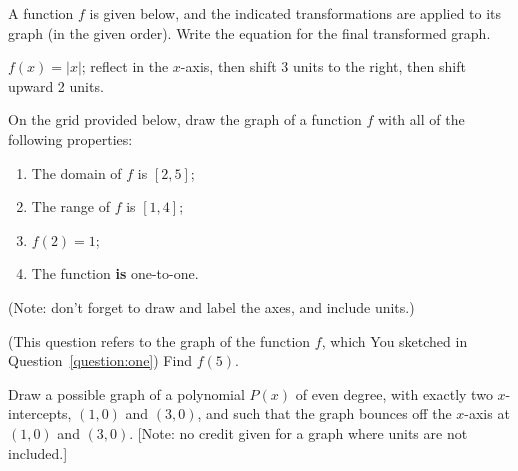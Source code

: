 \documentclass[11pt,answers]{exam}
\begin{document}
\begin{questions}
\question[1] A function $f$ is given below, and the indicated transformations are applied to its graph (in the given order). Write the equation for the final transformed graph.
\smallskip

$f(x) = |x|$;
reflect in the $x$-axis, then shift 3 units to the right, then shift upward 2 units.

\fillwithdottedlines{2cm}
\newpage
\question[2] \label{question:one} On the grid provided below, draw the graph of a function $f$ with all of the following properties:

\begin{minipage}[t][][b]{0.5\textwidth}
	\begin{multicols}{2}
		\begin{enumerate}
			\item The domain of $f$ is $[2,5]$;
			\item The range of $f$ is $[1,4]$;
			\item $f(2)=1$;
			\item The function {\bf{is}} one-to-one.
		\end{enumerate}
	\end{multicols}
	(Note: don't forget to draw and label the axes, and include units.)
\end{minipage}
\begin{minipage}[t][][b]{0.5\textwidth}
	\begin{center}
	\end{center}
\end{minipage}	
\bonusquestion[1] (This question refers to the graph of the function $f$, which You sketched in Question~\ref{question:one}) Find $f(5)$. %
\fillwithdottedlines{1cm}

\bonusquestion[2]  Draw a possible graph of a polynomial $P(x)$ of even degree, with exactly two $x$-intercepts, $(1,0)$ and $(3,0)$, and such that the graph bounces off the $x$-axis at $(1,0)$ and $(3,0)$. [Note: no credit given for a graph where units are not included.]
\smallskip\fillwithgrid{1.8in}




\end{questions}
\end{document}
